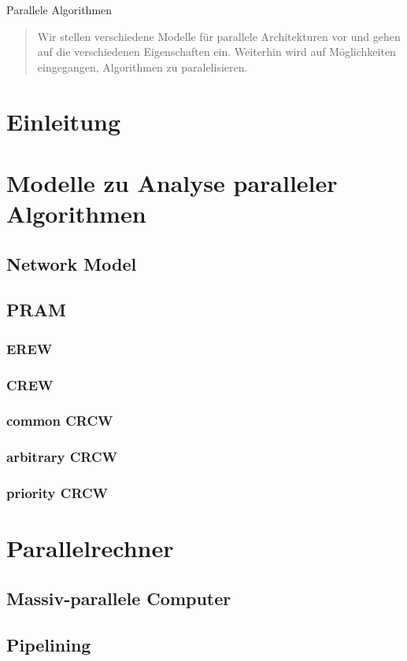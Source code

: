 %
{Parallele Algorithmen}
%
%
\begin{abstract}
Wir stellen verschiedene Modelle für parallele Architekturen vor und gehen auf die verschiedenen Eigenschaften ein. Weiterhin wird auf Möglichkeiten eingegangen, Algorithmen zu paralelisieren.
\end{abstract}
\pagebreak

\section{Einleitung}
\section{Modelle zu Analyse paralleler Algorithmen}
\subsection{Network Model}
\subsection{PRAM}
\subsubsection{EREW}
\subsubsection{CREW}
\subsubsection{common CRCW}
\subsubsection{arbitrary CRCW}
\subsubsection{priority CRCW}
\section{Parallelrechner}
\subsection{Massiv-parallele Computer}
\subsection{Pipelining}
